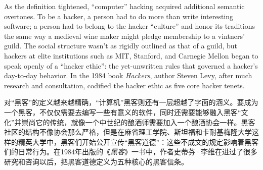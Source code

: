 \ifdefined\eng
As the definition tightened, ``computer'' hacking acquired additional semantic overtones. To be a hacker, a person had to do more than write interesting software; a person had to belong to the hacker ``culture'' and honor its traditions the same way a medieval wine maker might pledge membership to a vintners' guild. The social structure wasn't as rigidly outlined as that of a guild, but hackers at elite institutions such as MIT, Stanford, and Carnegie Mellon began to speak openly of a ``hacker ethic'': the yet-unwritten rules that governed a hacker's day-to-day behavior. In the 1984 book \textit{Hackers}, author Steven Levy, after much research and consultation, codified the hacker ethic as five core hacker tenets.
\fi

\ifdefined\chs
对``黑客''的定义越来越精确，``计算机''黑客则还有一层超越了字面的涵义。要成为一个黑客，不仅仅需要去编写一些有意义的软件，同时还需要能够融入黑客``文化''并崇尚它的传统，就像一个中世纪的酿酒师需要加入一个酿酒协会一样。黑客社区的结构不像协会那么严格，但是在麻省理工学院、斯坦福和卡耐基梅隆大学这样的精英大学中，黑客们开始公开宣传``黑客道德''：这些不成文的规定影响着黑客们的日常行为。在1984年出版的《\textit{黑客}》一书中，作者史蒂芬·李维在进过了很多研究和咨询以后，把黑客道德定义为五种核心的黑客信条。
\fi

